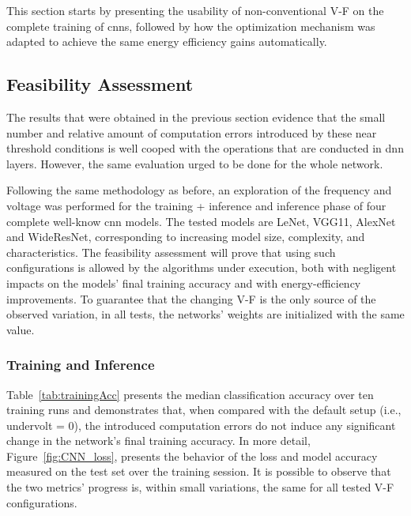This section starts by presenting the usability of non-conventional V-F on the complete training of \acrshort{cnn}s, followed by how the optimization mechanism was adapted to achieve the same energy efficiency gains automatically.

\subsection{Feasibility Assessment}
\label{sec:fea_ass}
The results that were obtained in the previous section evidence that the small number and relative amount of computation errors introduced by these near threshold conditions is well cooped with the operations that are conducted in \acrshort{dnn} layers. However, the same evaluation urged to be done for the whole network.


Following the same methodology as before, an exploration of the frequency and voltage was performed for the training + inference and inference phase of four complete well-know \acrshort{cnn} models. The tested models are LeNet, VGG11, AlexNet and WideResNet, corresponding to increasing model size, complexity, and characteristics. The feasibility assessment will prove that using such configurations is allowed by the algorithms under execution, both with negligent impacts on the models' final training accuracy and with energy-efficiency improvements. To guarantee that the changing V-F is the only source of the observed variation, in all tests, the networks' weights are initialized with the same value.


\subsubsection{Training and Inference}

Table~\ref{tab:trainingAcc} presents the median classification accuracy over ten training runs and demonstrates that, when compared with the default setup (i.e., undervolt = 0), the introduced computation errors do not induce any significant change in the network's final training accuracy. 
In more detail, Figure~\ref{fig:CNN_loss}, presents the behavior of the loss and model accuracy measured on the test set over the training session. It is possible to observe that the two metrics' progress is, within small variations, the same for all tested V-F configurations.

